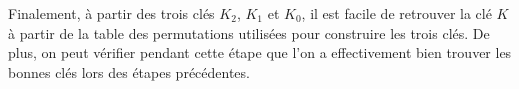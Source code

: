 Finalement, à partir des trois clés $K_2$, $K_1$ et $K_0$, il est facile de retrouver la clé $K$ à partir de la table des permutations utilisées pour construire les trois clés. De plus, on peut vérifier pendant cette étape que l'on a effectivement bien trouver les bonnes clés lors des étapes précédentes.



